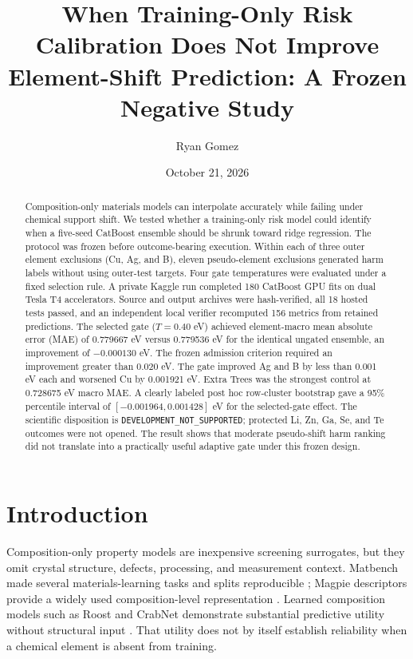 \documentclass[11pt]{article}
\title{When Training-Only Risk Calibration Does Not Improve\\Element-Shift Prediction: A Frozen Negative Study}
\author{Ryan Gomez}
\date{October 21, 2026}
\begin{document}
\maketitle

\begin{abstract}
Composition-only materials models can interpolate accurately while failing under
chemical support shift. We tested whether a training-only risk model could
identify when a five-seed CatBoost ensemble should be shrunk toward ridge
regression. The protocol was frozen before outcome-bearing execution. Within
each of three outer element exclusions (Cu, Ag, and B), eleven pseudo-element
exclusions generated harm labels without using outer-test targets. Four gate
temperatures were evaluated under a fixed selection rule. A private Kaggle run
completed 180 CatBoost GPU fits on dual Tesla T4 accelerators. Source and output
archives were hash-verified, all 18 hosted tests passed, and an independent
local verifier recomputed 156 metrics from retained predictions. The selected
gate ($T=0.40$ eV) achieved element-macro mean absolute error (MAE) of
0.779667 eV versus 0.779536 eV for the identical ungated ensemble, an
improvement of $-0.000130$ eV. The frozen admission criterion required an
improvement greater than 0.020 eV. The gate improved Ag and B by less than
0.001 eV each and worsened Cu by 0.001921 eV. Extra Trees was the strongest
control at 0.728675 eV macro MAE. A clearly labeled post hoc row-cluster
bootstrap gave a 95\% percentile interval of $[-0.001964,0.001428]$ eV for the
selected-gate effect. The scientific disposition is
\texttt{DEVELOPMENT\_\allowbreak{}NOT\_\allowbreak{}SUPPORTED}; protected Li, Zn, Ga, Se, and Te outcomes
were not opened. The result shows that moderate pseudo-shift harm ranking did
not translate into a practically useful adaptive gate under this frozen design.
\end{abstract}

\section{Introduction}
Composition-only property models are inexpensive screening surrogates, but they
omit crystal structure, defects, processing, and measurement context. Matbench
made several materials-learning tasks and splits reproducible
\citep{dunn2020matbench}; Magpie descriptors provide a widely used
composition-level representation \citep{ward2016magpie}. Learned composition
models such as Roost and CrabNet demonstrate substantial predictive utility
without structural input \citep{goodall2020roost,wang2021crabnet}. That utility
does not by itself establish reliability when a chemical element is absent from
training.
\end{document}
